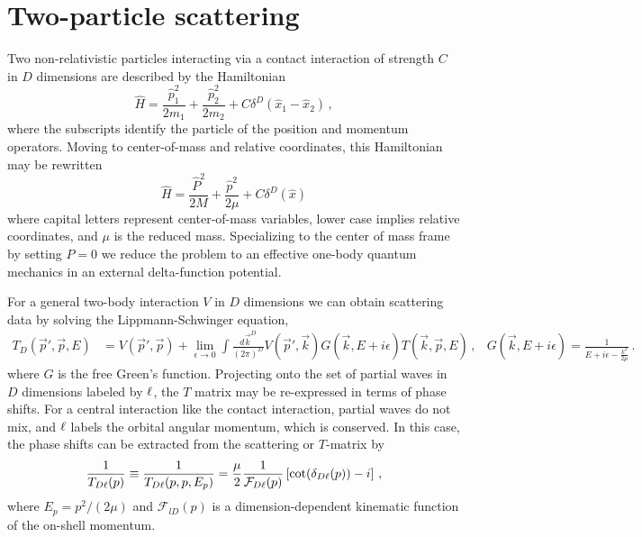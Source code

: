 \section{Two-particle scattering}\label{sec:scattering}

Two non-relativistic particles interacting via a contact interaction of strength $C$ in $D$ dimensions are described by the Hamiltonian
\begin{equation}
    \label{eq:particle hamiltonian}
    \hat H = \frac{\hat p_1^2}{2 m_1} + \frac{\hat p_2^2}{2 m_2} + C \delta^D(\hat x_1 - \hat x_2)
    \,,
\end{equation}
where the subscripts identify the particle of the position and momentum operators.
Moving to center-of-mass and relative coordinates, this Hamiltonian may be rewritten
\begin{equation}
    \label{eq:hamiltonian}
    \hat H = \frac{\hat P^2}{2 M} + \frac{\hat p^2}{2 \mu} + C\delta^D(\hat{x})
\end{equation}
where capital letters represent center-of-mass variables, lower case implies relative coordinates, and $\mu$ is the reduced mass.
Specializing to the center of mass frame by setting $P=0$ we reduce the problem to an effective one-body quantum mechanics in an external delta-function potential.

For a general two-body interaction $V$ in $D$ dimensions we can obtain scattering data by solving the Lippmann-Schwinger equation,
\begin{align}
	T_D(\vec p', \vec p, E)
	&=
	V(\vec p', \vec p) + \lim\limits_{\epsilon \to 0}\int \frac{d \vec k^D}{(2\pi)^D} V(\vec p', \vec k) G(\vec k, E + i \epsilon) T(\vec k, \vec p, E) \, ,
	&
	G(\vec k, E+ i \epsilon) = \frac{1}{E + i \epsilon - \frac{k^2}{2\mu}}
	\, .
\end{align}
where $G$ is the free Green's function.
Projecting onto the set of partial waves in $D$ dimensions labeled by $\ell$, the $T$ matrix may be re-expressed in terms of phase shifts.
For a central interaction like the contact interaction, partial waves do not mix, and $\ell$ labels the orbital angular momentum, which is conserved.
In this case, the phase shifts can be extracted from the scattering or $T$-matrix by
\begin{align}\label{eq:on-shell-T}
	\frac{1}{T_{D\ell}(p)}
    \equiv
    \frac{1}{T_{D\ell}(p, p, E_p)}
    = \frac{\mu}{2}
    \frac{1}{\mathcal F_{D\ell}(p)} \left[\cot (\delta_{D\ell}(p)) - i\right] \, ,
\end{align}
where $E_p = p^2 / (2 \mu)$ and $\mathcal F_{l D}(p)$ is a dimension-dependent kinematic function of the on-shell momentum.

